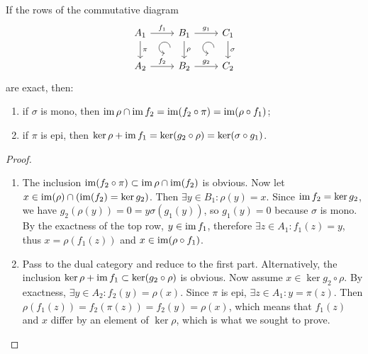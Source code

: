 \begin{lem}[3-lemma]
    If the rows of the commutative diagram 
    \[\begin{tikzcd}[every matrix/.append style={name=m},   
        execute at end picture={\draw [<-] ([xshift=-7mm,yshift=-10mm]m-1-2.north) arc[start angle=-90,delta angle=-270,radius=0.2cm];
        \draw [<-] ([xshift=-7mm,yshift=-10mm]m-1-3.north) arc[start angle=-90,delta angle=-270,radius=0.2cm];}]
        A_1 \arrow[r,"f_1"]\arrow[d,"\pi"] & B_1\arrow[d,"\rho"]\arrow[r,"g_1"] & C_1\arrow[d,"\sigma"] \\
        A_2\arrow[r,"f_2"] &B_2 \arrow[r,"g_2"] &C_2 
    \end{tikzcd}\]
    are exact, then:
    \begin{enumerate}
        \item if $\sigma$ is mono, then $\operatorname{im}\rho\cap\operatorname{im} f_2=\operatorname{im}(f_2\circ \pi)=\operatorname{im}(\rho\circ f_1)$;
        \item if $\pi$ is epi, then $\ker\rho+\operatorname{im} f_1=\ker(g_2\circ\rho)=\ker(\sigma\circ g_1)$.
    \end{enumerate}
\end{lem}
\begin{proof}
    \begin{enumerate}
        \item The inclusion $\operatorname{im}(f_2\circ\pi)\subset \operatorname{im}\rho\cap \operatorname{im}(f_2)$ is obvious. Now let $x\in \operatorname{im}(\rho)\cap(\operatorname{im}(f_2)=\ker g_2)$. Then $\exists y\in B_1: \rho(y)=x$. Since $\operatorname{im} f_2=\ker g_2$, we have $g_2(\rho(y))=0=y\sigma(g_1(y))$, so $g_1(y)=0$ because $\sigma$ is mono. By the exactness of the top row, $y\in\operatorname{im} f_1$, therefore $\exists z\in A_1:f_1(z)=y$, thus $x=\rho(f_1(z))$ and $x\in\operatorname{im}(\rho\circ f_1)$.
        \item Pass to the dual category and reduce to the first part. Alternatively, the inclusion $\ker\rho+\operatorname{im} f_1\subset \ker(g_2\circ\rho)$ is obvious. Now assume $x\in \ker g_2\circ\rho$. By exactness, $\exists y\in A_2:f_2(y)=\rho(x)$. Since $\pi$ is epi, $\exists z\in A_1:y=\pi(z)$. Then $\rho(f_1(z))=f_2(\pi(z))=f_2(y)=\rho(x)$, which means that $f_1(z)$ and $x$ differ by an element of $\ker\rho$, which is what we sought to prove.
    \end{enumerate}
\end{proof}

